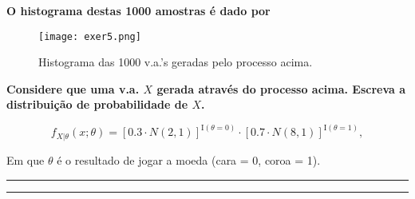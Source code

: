 \documentclass[12pt, oldfontcommands]{article}\usepackage[]{graphicx}\usepackage[]{color}
\newcommand{\horrule}[1]{\rule{\linewidth}{#1}}
\begin{document}
\textbf{O histograma destas 1000 amostras é dado por}

\vspace{\fill}
\begin{figure}[H]
 \centering
  \texttt{[image: exer5.png]}
 \caption{Histograma das 1000 v.a.'s geradas pelo processo acima.}
 \label{fig:exer5}
\end{figure}

\textbf{Considere que uma v.a. \(X\) gerada através do processo acima.
        Escreva a distribuição de probabilidade de \(X\).}

\[f_{X | \theta}(x; \theta) =
   [0.3 \cdot N(2, 1)]^{\text{I}(\theta = 0)}
   \cdot
   [0.7 \cdot N(8, 1)]^{\text{I}(\theta = 1)}, \]

Em que \(\theta\) é o resultado de jogar a moeda (cara = 0, coroa = 1). \\

\horrule{.5pt}

\vspace{\fill}

\horrule{1pt} \\
\end{document}

